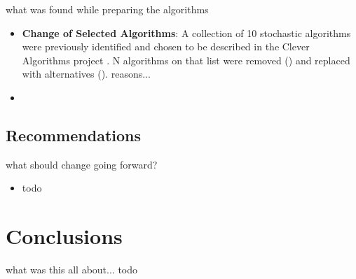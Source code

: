 \documentclass[a4paper, 11pt]{article}
\begin{document}
what was found while preparing the algorithms

\begin{itemize}
	\item \textbf{Change of Selected Algorithms}: A  collection of 10 stochastic algorithms were previously identified and chosen to be described in the Clever Algorithms project \cite{Brownlee2010b}. N algorithms on that list were removed () and replaced with alternatives (). reasons...
	\item
	
\end{itemize}


% 
% 
\subsection{Recommendations}

what should change going forward?

\begin{itemize}
	\item todo
\end{itemize}

% 
% 
\section{Conclusions}
\label{sec:conclusions}
what was this all about... todo




\end{document}
